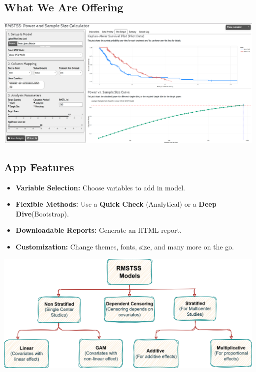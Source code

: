 \documentclass[a0,landscape]{a0poster}
\begin{document}
\begin{minipage}[t]{0.54\linewidth}
    \subsection*{\color{HeadingColor}\Large What We Are Offering}
    {\centering \includegraphics[width=\linewidth,height = 0.58\linewidth]{images/app-ss.png}\par}

\vspace{0.2cm}    
    \subsection*{\color{HeadingColor}\Large App Features}
    \begin{itemize}
        \item[{\color{BulletColor}\Large\checkmark}] \Large \textbf{Variable Selection:} Choose variables to add in model.
        \item[{\color{BulletColor}\Large\checkmark}] \Large \textbf{Flexible Methods:} Use a \textbf{Quick Check} (Analytical) or a \textbf{Deep Dive}(Bootstrap).
        \item[{\color{BulletColor}\Large\checkmark}] \Large \textbf{Downloadable Reports:} Generate an HTML report.
        \item[{\color{BulletColor}\Large\checkmark}] \Large \textbf{Customization:} Change themes, fonts, size, and many more on the go.
    \end{itemize}
\vspace{0.2cm}    
    {\centering \includegraphics[width=\linewidth]{images/app-models.png}\par}
\end{minipage}
\end{document}
